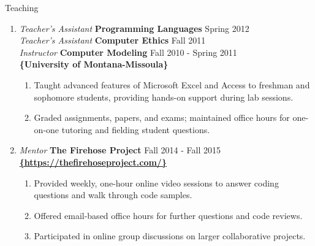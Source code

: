 \documentclass[oneside]{article}%
\begin{document}
\noindent
\huge{Teaching}
\small
\begin{enumerate}[]
	\item \textit{Teacher's Assistant} \textbf{Programming Languages} \hfill Spring 2012\\
		\textit{Teacher's Assistant} \textbf{Computer Ethics} \hfill Fall 2011\\
		\textit{Instructor} \textbf{Computer Modeling} \hfill Fall 2010 - Spring 2011\\
		\textbf{\{University of Montana-Missoula\}}
		\begin{enumerate}[-]
			\item Taught advanced features of Microsoft Excel and Access to freshman and sophomore students, providing hands-on support during lab sessions.
			\item Graded assignments, papers, and exams; maintained office hours for one-on-one tutoring and fielding student questions.
		\end{enumerate}
	\item \textit{Mentor} \textbf{The Firehose Project} \hfill Fall 2014 - Fall 2015\\
		\textbf{\href{https://thefirehoseproject.com/}{\{https://thefirehoseproject.com/\}}}
		\begin{enumerate}[-]
			\item Provided weekly, one-hour online video sessions to answer coding questions and walk through code samples.
			\item Offered email-based office hours for further questions and code reviews.
			\item Participated in online group discussions on larger collaborative projects.
		\end{enumerate}
\end{enumerate}

\newpage
\end{document}
